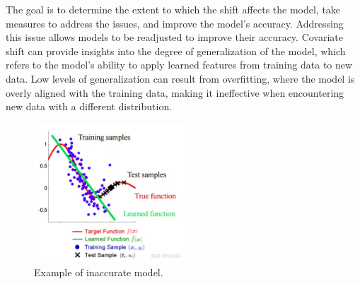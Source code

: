 The goal is to determine the extent to which the shift affects the model, take measures to address the issues, and improve the model's accuracy. Addressing this issue allows models to be readjusted to improve their accuracy. Covariate shift can provide insights into the degree of generalization of the model, which refers to the model's ability to apply learned features from training data to new data. Low levels of generalization can result from overfitting, where the model is overly aligned with the training data, making it ineffective when encountering new data with a different distribution.  
  	

\begin{figure}[H]
	\centering
	\includegraphics[width=0.5\textwidth]{assets/covariate_shift.png} 
	\caption{Example of inaccurate model.}
	\label{fig:inaccurate-model}
\end{figure}  

